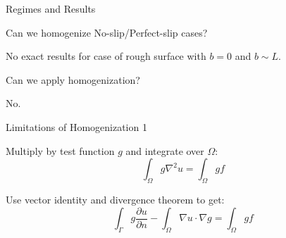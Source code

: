 \documentclass{beamer}
\begin{document}
\begin{frame}{Regimes and Results}
\begin{adjustbox}{scale=0.55, center}

\end{adjustbox}

\end{frame}


\begin{frame}{Can we homogenize No-slip/Perfect-slip cases?}

No exact results for case of rough surface with $b=0$ and $b \sim L$.

\vspace{1em}
Can we apply homogenization?

\vspace{1em}
No.

\end{frame}


\begin{frame}{Limitations of Homogenization 1}

\begin{center}
\end{center}


Multiply by test function $g$ and integrate over $\Omega$:
\begin{equation}
\int_{\Omega} g \nabla^2 u = \int_{\Omega} g f
\end{equation}

Use vector identity and divergence theorem to get:
\begin{equation}
\int_{\Gamma} g \frac{\partial u}{\partial n}
 - \int_{\Omega} \nabla u \cdot \nabla g  
= \int_{\Omega} g f
\end{equation}

\end{frame}
\end{document}
